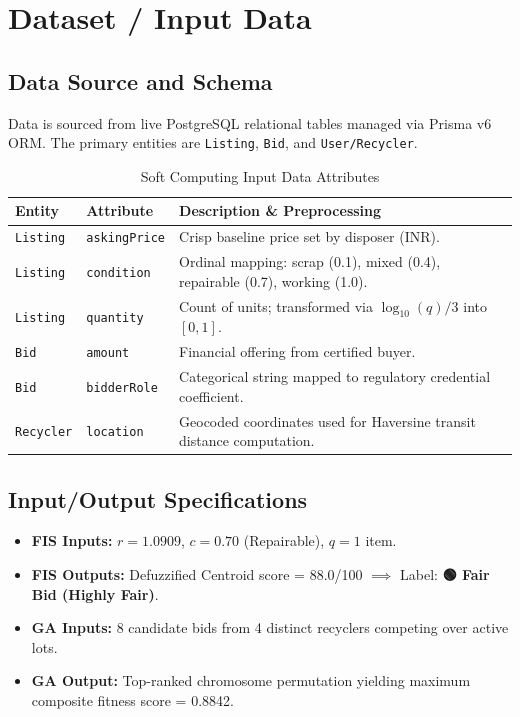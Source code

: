 \documentclass[12pt,a4paper]{article}
\begin{document}
\section{Dataset / Input Data}

\subsection{Data Source and Schema}
Data is sourced from live PostgreSQL relational tables managed via Prisma v6 ORM. The primary entities are \texttt{Listing}, \texttt{Bid}, and \texttt{User/Recycler}.

\begin{table}[H]
\centering
\small
\caption{Soft Computing Input Data Attributes}
\label{tab:attributes}
\begin{tabularx}{\textwidth}{p{3.2cm}p{2.5cm}X}
\toprule
\textbf{Entity} & \textbf{Attribute} & \textbf{Description \& Preprocessing} \\
\midrule
\texttt{Listing} & \texttt{askingPrice} & Crisp baseline price set by disposer (INR). \\
\texttt{Listing} & \texttt{condition} & Ordinal mapping: scrap (0.1), mixed (0.4), repairable (0.7), working (1.0). \\
\texttt{Listing} & \texttt{quantity} & Count of units; transformed via $\log_{10}(q)/3$ into $[0,1]$. \\
\texttt{Bid} & \texttt{amount} & Financial offering from certified buyer. \\
\texttt{Bid} & \texttt{bidderRole} & Categorical string mapped to regulatory credential coefficient. \\
\texttt{Recycler} & \texttt{location} & Geocoded coordinates used for Haversine transit distance computation. \\
\bottomrule
\end{tabularx}
\end{table}

\subsection{Input/Output Specifications}
\begin{itemize}
    \item \textbf{FIS Inputs:} $r = 1.0909$, $c = 0.70$ (Repairable), $q = 1$ item.
    \item \textbf{FIS Outputs:} Defuzzified Centroid score = 88.0/100 $\implies$ Label: \textbf{🟢 Fair Bid (Highly Fair)}.
    \item \textbf{GA Inputs:} 8 candidate bids from 4 distinct recyclers competing over active lots.
    \item \textbf{GA Output:} Top-ranked chromosome permutation yielding maximum composite fitness score = 0.8842.
\end{itemize}
\end{document}
